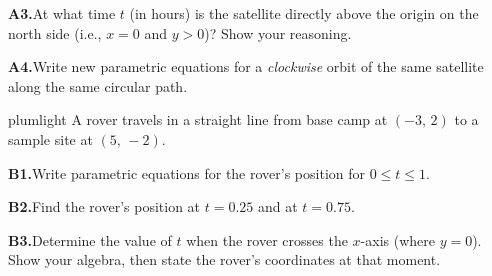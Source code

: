 \documentclass[10pt]{article}
\begin{document}
\vspace{0.08in}

\begin{tcolorbox}[colback=white, colframe=black!40,
    title=\textbf{Tier A --- Approaching Proficiency},
    fonttitle=\bfseries, arc=2mm, left=3mm, right=3mm, top=2mm, bottom=2mm]

\textbf{A3.}\quad At what time $t$ (in hours) is the satellite directly
above the origin on the north side (i.e., $x = 0$ and $y > 0$)?
Show your reasoning.

\vspace{0.04in}
\textbf{A4.}\quad Write new parametric equations for a \emph{clockwise}
orbit of the same satellite along the same circular path.

\end{tcolorbox}

\vspace{0.08in}

\begin{scenariobox}{plumlight}
A rover travels in a straight line from base camp at $(-3,\,2)$ to a
sample site at $(5,\,-2)$.
\end{scenariobox}

\vspace{0.08in}

\begin{tcolorbox}[colback=white, colframe=black!40,
    title=\textbf{Tier E --- Extension},
    fonttitle=\bfseries, arc=2mm, left=3mm, right=3mm, top=2mm, bottom=2mm]

\textbf{B1.}\quad Write parametric equations for the rover's position
for $0 \le t \le 1$.

\vspace{0.04in}
\textbf{B2.}\quad Find the rover's position at $t = 0.25$ and at $t = 0.75$.

\vspace{0.04in}
\textbf{B3.}\quad Determine the value of $t$ when the rover crosses the
$x$-axis (where $y = 0$). Show your algebra, then state the rover's
coordinates at that moment.

\end{tcolorbox}
\end{document}
